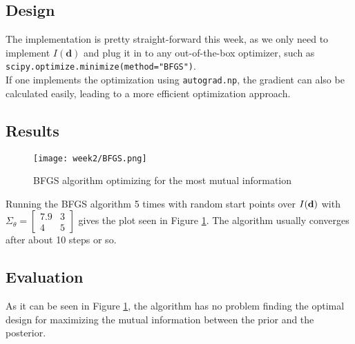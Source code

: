 \subsection{Design}
The implementation is pretty straight-forward this week, as we only need to implement $I(\textbf{d})$ and plug it in to any out-of-the-box optimizer, such as \texttt{scipy.optimize.minimize(method="BFGS")}.\\
If one implements the optimization using \texttt{autograd.np}, the gradient can also be calculated easily, leading to a more efficient optimization approach.
\subsection{Results}
\begin{figure}
  \centering
  \texttt{[image: week2/BFGS.png]}
  \caption{BFGS algorithm optimizing for the most mutual information}
  \label{fig:BFGS}
\end{figure}
Running the BFGS algorithm 5 times with random start points over $I(\mathbf{d})$ with $\Sigma_\theta=\begin{bmatrix}7.9 & 3 \\ 4 & 5\end{bmatrix}$ gives the plot seen in Figure \ref{fig:BFGS}. The algorithm usually converges after about 10 steps or so.
\subsection{Evaluation}
As it can be seen in Figure \ref{fig:BFGS}, the algorithm has no problem finding the optimal design for maximizing the mutual information between the prior and the posterior.
